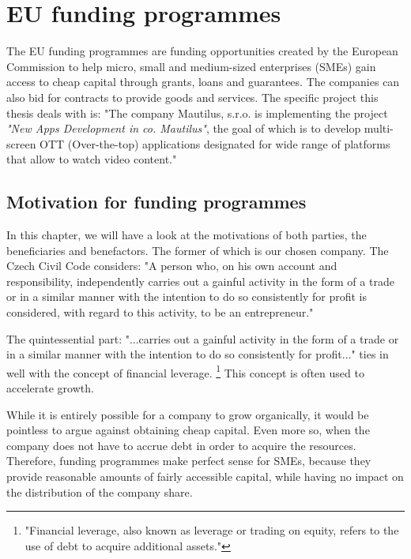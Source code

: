 \documentclass[12pt,oneside]{fithesis2}
\begin{document}
\section{EU funding programmes}
The EU funding programmes are funding opportunities created by the European Commission to help micro, small and medium-sized enterprises (SMEs) gain access to cheap capital through grants, loans and guarantees. The companies can also bid for contracts to provide goods and services.
The specific project this thesis deals with is: "The company Mautilus, s.r.o. is implementing the project \textit{"New Apps Development in co. Mautilus"}, the goal of which is to develop multi-screen OTT (Over-the-top) applications designated for wide range of platforms that allow to watch video content." \cite{mau-eu-subsidy}
\subsection{Motivation for funding programmes}\label{motivation}
In this chapter, we will have a look at the motivations of both parties, the beneficiaries and benefactors. The former of which is our chosen company.
The Czech Civil Code considers: "A person who, on his own account and responsibility, independently carries out a gainful activity in the form of a trade or in a similar manner with the intention to do so consistently for profit is considered, with regard to this activity, to be an entrepreneur."\cite{entrepreneur-law}
\par
The quintessential part: "...carries out a gainful activity in the form of a trade or in a similar manner with the intention to do so consistently for profit..."\cite{entrepreneur-law} ties in well with the concept of financial leverage. \footnote{"Financial leverage, also known as leverage or trading on equity, refers to the use of debt to acquire additional assets."\cite{financial-leverage}} This concept is often used to accelerate growth.
\par
While it is entirely possible for a company to grow organically, it would be pointless to argue against obtaining cheap capital. Even more so, when the company does not have to accrue debt in order to acquire the resources. Therefore, funding programmes make perfect sense for SMEs, because they provide reasonable amounts of fairly accessible capital, while having no impact on the distribution of the company share.
\end{document}
